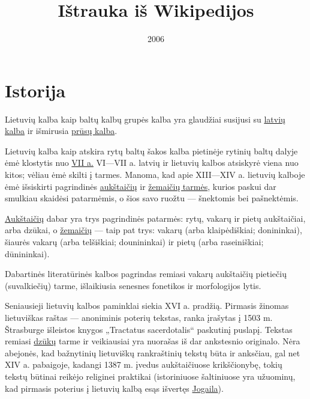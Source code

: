 \documentclass[a4paper]{article}
\title{Ištrauka iš Wikipedijos}
\date{2006}
\begin{document}
\maketitle
\section{Istorija}


Lietuvių kalba kaip baltų kalbų grupės kalba yra glaudžiai susijusi su 
\href{http://lt.wikipedia.org/wiki/Latvi%C5%B3_kalba}{latvių kalba} 
ir išmirusia \href{http://lt.wikipedia.org/wiki/Pr%C5%ABs%C5%B3_kalba}{prūsų kalba}.

Lietuvių kalba kaip atskira rytų baltų šakos kalba pietinėje rytinių baltų dalyje ėmė klostytis 
nuo \href{http://lt.wikipedia.org/wiki/VII_am%C5%BEius}{VII a.} VI—VII a. latvių ir lietuvių kalbos 
atsiskyrė viena nuo kitos; vėliau ėmė skilti į tarmes. Manoma, kad apie XIII—XIV a. 
lietuvių kalboje ėmė išsiskirti pagrindinės 
\href{http://lt.wikipedia.org/w/index.php?title=Auk%C5%A1tai%C4%8Di%C5%B3_tarm%C4%97&amp;action=edit}{aukštaičių}
 ir \href{http://lt.wikipedia.org/wiki/%C5%BDemai%C4%8Di%C5%B3_tarm%C4%97"}{žemaičių tarmės}, 
kurios paskui dar smulkiau skaidėsi patarmėmis, o šios savo ruožtu — šnektomis bei pašnektėmis.

\href{http://lt.wikipedia.org/wiki/Auk%C5%A1taitija}{Aukštaičių} dabar yra trys pagrindinės patarmės:
 rytų, vakarų ir pietų aukštaičiai, arba dzūkai, 
o \href{http://lt.wikipedia.org/wiki/%C5%BDemaitija}{žemaičių} — taip pat trys: 
vakarų (arba klaipėdiškiai; donininkai), šiaurės vakarų (arba telšiškiai; dounininkai) 
ir pietų (arba raseiniškiai; dūnininkai).

Dabartinės literatūrinės kalbos pagrindas remiasi vakarų aukštaičių pietiečių (suvalkiečių) tarme, 
išlaikiusia senesnes fonetikos ir morfologijos lytis.

Seniausieji lietuvių kalbos paminklai siekia XVI a. pradžią. Pirmasis žinomas lietuviškas raštas — 
anoniminis poterių tekstas, ranka įrašytas į 1503 m. Štrasburge išleistos knygos 
„Tractatus sacerdotalis“ paskutinį puslapį. Tekstas remiasi 
\href{http://lt.wikipedia.org/wiki/Dz%C5%ABkai}{dzūkų} tarme ir veikiausiai yra nuorašas iš dar 
ankstesnio originalo. Nėra abejonės, kad bažnytinių lietuviškų rankraštinių tekstų būta ir anksčiau, 
gal net XIV a. pabaigoje, kadangi 1387 m. įvedus aukštaičiuose krikščionybę, tokių tekstų būtinai 
reikėjo religinei praktikai (istoriniuose šaltiniuose yra užuominų, kad pirmasis poterius į lietuvių 
kalbą esąs išvertęs \href{http://lt.wikipedia.org/wiki/Jogaila}{Jogaila}).
\end{document}
